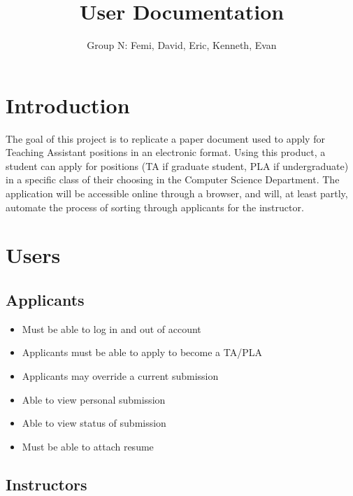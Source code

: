 \documentclass[11pt]{amsart}
\title{User Documentation}
\author{Group N: Femi, David, Eric, Kenneth, Evan}
\begin{document}
\maketitle
\section{Introduction}
\noindent The goal of this project is to replicate a paper document used to apply for Teaching Assistant positions in an electronic format. Using this product, a student can apply for positions (TA if graduate student, PLA if undergraduate) in a specific class of their choosing in the Computer Science Department. The application will be accessible online through a browser, and will, at least partly, automate the process of sorting through applicants for the instructor.
\section{Users}
\subsection{Applicants}

\begin{itemize}
\item{Must be able to log in and out of account}


\item{Applicants must be able to apply to become a TA/PLA}


\item{Applicants may override a current submission}


\item{Able to view personal submission}


\item{Able to view status of submission}


\item{Must be able to attach resume}


\end{itemize}

\subsection{Instructors}
\end{document}
